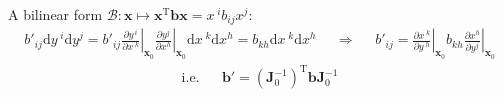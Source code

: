 \documentclass{article}
\theoremstyle{plain}
\theoremstyle{definition}
\newcommand{\md}{\mathrm{d}}
\newcommand*{\bv}{\boldsymbol}
\newcommand*{\bm}{\boldsymbol}
\begin{document}
A bilinear form $\mathscr{B}: \bv x \mapsto \bv x^{\mathrm{T}} \bm b \bv x = x^{\;i}b_{ij}x^j$: 
\begin{align*}
	b'_{ij}\md y^{\;i} \md y^j 
	= b'_{ij} \left.\frac{\partial y^{\,i}}{\partial x^{\;k}}\right|_{\bv x_0}
	\left.\frac{\partial y^j}{\partial x^h}\right|_{\bv x_0}\md x^{\;k}\md x^h 
	=b_{kh} \md x^{\;k}\md x^h 
	&&\Rightarrow&&
	b'_{ij} =\left. \frac{\partial x^{\;k}}{\partial y^{\;h}}\right|_{\bv x_0}
	b_{kh} 
	\left.\frac{\partial x^h}{\partial y^j}\right|_{\bv x_0}
\end{align*}
\begin{align}\label{bilinear form}
	\text{i.e.} &&
	\bm b' = (\bm J^{-1}_0)^{\mathrm{T}} \bm b \bm J^{-1}_0
\end{align}
\printindex
\end{document}
